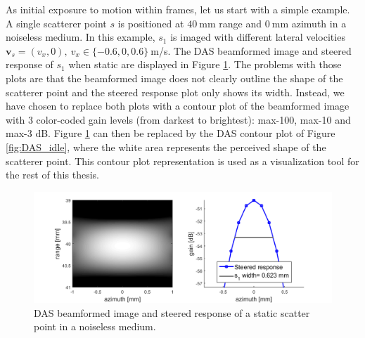 As initial exposure to motion within frames, let us start with a simple example. A single scatterer point $s$ is positioned at $40~$mm range and $0~$mm azimuth in a noiseless medium. In this example, $s_1$ is imaged with different lateral velocities $\boldsymbol{v}_s = (v_x, 0),~ v_x \in \{-0.6, 0, 0.6\}~$m/s.
The DAS beamformed image and steered response of $s_1$ when static are displayed in Figure \ref{fig:DAS_steered}. The problems with those plots are that the beamformed image does not clearly outline the shape of the scatterer point and the steered response plot only shows its width. Instead, we have chosen to replace both plots with a contour plot of the beamformed image with 3 color-coded gain levels (from darkest to brightest): max-100, max-10 and max-3 dB.
Figure \ref{fig:DAS_steered} can then be replaced by the DAS contour plot of Figure \ref{fig:DAS_idle}, where the white area represents the perceived shape of the scatterer point.
This contour plot representation is used as a visualization tool for the rest of this thesis.

\begin{figure}[ht]
    \centering
    \includegraphics[width=\linewidth]{./images/results/2.1/DAS_steered2.png}
	\caption{DAS beamformed image and steered response of a static scatter point in a noiseless medium.}
	\label{fig:DAS_steered}
\end{figure}

